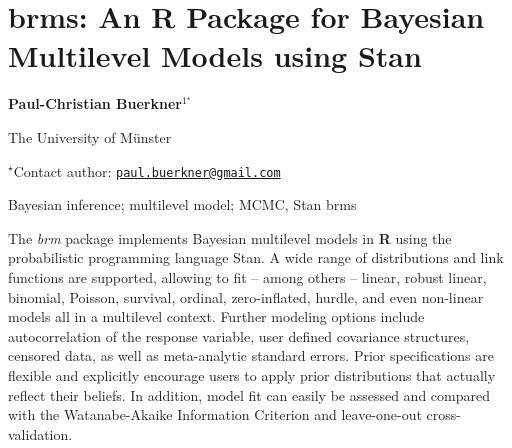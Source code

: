 \documentclass[\main/boa.tex]{subfiles}
\begin{document}
\section{brms: An R Package for Bayesian Multilevel Models using Stan}

\begin{center}
  {\bf Paul-Christian Buerkner$^{1^\star}$}
\end{center}

\vskip 0.3cm

\begin{affiliations}
\begin{enumerate}
\begin{minipage}{0.915\textwidth}
\centering
\item The University of Münster \\[-2pt]
\end{minipage}
\end{enumerate}
$^\star$Contact author: \href{mailto:paul.buerkner@gmail.com}{\nolinkurl{paul.buerkner@gmail.com}}\\
\end{affiliations}

\vskip 0.5cm

\begin{minipage}{0.915\textwidth}
\keywords Bayesian inference; multilevel model; MCMC, Stan
\packages brms
\end{minipage}

\vskip 0.8cm

The \emph{brm} package implements Bayesian multilevel models in
\textbf{R} using the probabilistic programming language Stan. A wide
range of distributions and link functions are supported, allowing to fit
-- among others -- linear, robust linear, binomial, Poisson, survival,
ordinal, zero-inflated, hurdle, and even non-linear models all in a
multilevel context. Further modeling options include autocorrelation of
the response variable, user defined covariance structures, censored
data, as well as meta-analytic standard errors. Prior specifications are
flexible and explicitly encourage users to apply prior distributions
that actually reflect their beliefs. In addition, model fit can easily
be assessed and compared with the Watanabe-Akaike Information Criterion
and leave-one-out cross-validation.
\end{document}
